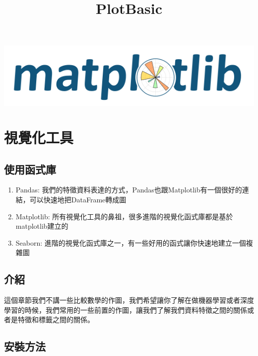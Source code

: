 \documentclass[11pt]{ctexart}
\title{PlotBasic}
\makeatletter
\def\maxwidth{\ifdim\Gin@nat@width>\linewidth\linewidth
    \else\Gin@nat@width\fi}
\let\Oldincludegraphics\includegraphics
\renewcommand{\includegraphics}[1]{\Oldincludegraphics[width=.8\maxwidth]{#1}}
\providecommand{\tightlist}{%
      \setlength{\itemsep}{0pt}\setlength{\parskip}{0pt}}
\makeatother
\begin{document}
    
    
    \maketitle
    
    

    
    \includegraphics{matlogo.png}

\hypertarget{ux8996ux89baux5316ux5de5ux5177}{%
\section{視覺化工具}\label{ux8996ux89baux5316ux5de5ux5177}}

\hypertarget{ux4f7fux7528ux51fdux5f0fux5eab}{%
\subsection{使用函式庫}\label{ux4f7fux7528ux51fdux5f0fux5eab}}

\begin{enumerate}
\def\labelenumi{\arabic{enumi}.}
\tightlist
\item
  Pandas:
  我們的特徵資料表達的方式，Pandas也跟Matplotlib有一個很好的連結，可以快速地把DataFrame轉成圖
\item
  Matplotlib:
  所有視覺化工具的鼻祖，很多進階的視覺化函式庫都是基於matplotlib建立的
\item
  Seaborn:
  進階的視覺化函式庫之一，有一些好用的函式讓你快速地建立一個複雜圖
\end{enumerate}

\hypertarget{ux4ecbux7d39}{%
\subsection{介紹}\label{ux4ecbux7d39}}

這個章節我們不講一些比較數學的作圖，我們希望讓你了解在做機器學習或者深度學習的時候，我們常用的一些前置的作圖，讓我們了解我們資料特徵之間的關係或者是特徵和標籤之間的關係。

\hypertarget{ux5b89ux88ddux65b9ux6cd5}{%
\subsection{安裝方法}\label{ux5b89ux88ddux65b9ux6cd5}}
\end{document}
